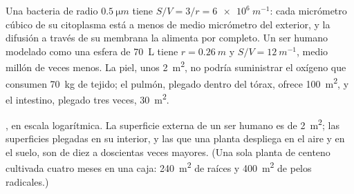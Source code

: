 \begin{example}\label{ex:b1:organism-environment:svnumbers}
Una bacteria de radio $\qty{0.5}{\micro m}$ tiene
$S/V = 3/r = \qty{6e6}{m^{-1}}$: cada micrómetro cúbico de su citoplasma
está a menos de medio micrómetro del exterior, y la difusión a través de su
membrana la alimenta por completo. Un ser humano modelado como una esfera de
\qty{70}{L} tiene $r = \qty{0.26}{m}$ y $S/V = \qty{12}{m^{-1}}$, medio
millón de veces menos. La piel, unos \qty{2}{m^2}, no podría suministrar el
oxígeno que consumen \qty{70}{kg} de tejido; el pulmón, plegado dentro del
tórax, ofrece \qty{100}{m^2}, y el intestino, plegado tres veces,
\qty{30}{m^2}.
\end{example}

\begin{omfigure}

{\small {}, en escala logarítmica. La superficie
externa de un ser humano es de \qty{2}{m^2}; las superficies plegadas en su
interior, y las que una planta despliega en el aire y en el suelo, son de
diez a doscientas veces mayores. (Una sola planta de centeno cultivada
cuatro meses en una caja: \qty{240}{m^2} de raíces y \qty{400}{m^2} de pelos
radicales.)}
\end{omfigure}

